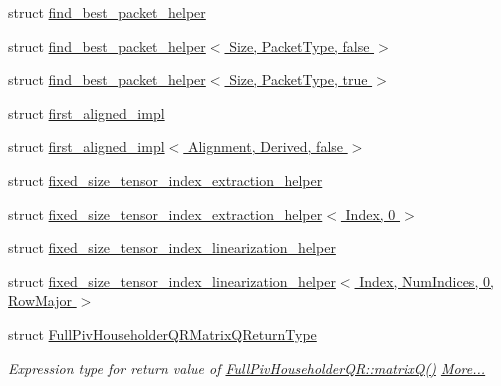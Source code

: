 \begin{DoxyCompactItemize}
\item 
struct \hyperlink{struct_eigen_1_1internal_1_1find__best__packet__helper}{find\+\_\+best\+\_\+packet\+\_\+helper}
\item 
struct \hyperlink{struct_eigen_1_1internal_1_1find__best__packet__helper_3_01_size_00_01_packet_type_00_01false_01_4}{find\+\_\+best\+\_\+packet\+\_\+helper$<$ Size, Packet\+Type, false $>$}
\item 
struct \hyperlink{struct_eigen_1_1internal_1_1find__best__packet__helper_3_01_size_00_01_packet_type_00_01true_01_4}{find\+\_\+best\+\_\+packet\+\_\+helper$<$ Size, Packet\+Type, true $>$}
\item 
struct \hyperlink{struct_eigen_1_1internal_1_1first__aligned__impl}{first\+\_\+aligned\+\_\+impl}
\item 
struct \hyperlink{struct_eigen_1_1internal_1_1first__aligned__impl_3_01_alignment_00_01_derived_00_01false_01_4}{first\+\_\+aligned\+\_\+impl$<$ Alignment, Derived, false $>$}
\item 
struct \hyperlink{struct_eigen_1_1internal_1_1fixed__size__tensor__index__extraction__helper}{fixed\+\_\+size\+\_\+tensor\+\_\+index\+\_\+extraction\+\_\+helper}
\item 
struct \hyperlink{struct_eigen_1_1internal_1_1fixed__size__tensor__index__extraction__helper_3_01_index_00_010_01_4}{fixed\+\_\+size\+\_\+tensor\+\_\+index\+\_\+extraction\+\_\+helper$<$ Index, 0 $>$}
\item 
struct \hyperlink{struct_eigen_1_1internal_1_1fixed__size__tensor__index__linearization__helper}{fixed\+\_\+size\+\_\+tensor\+\_\+index\+\_\+linearization\+\_\+helper}
\item 
struct \hyperlink{struct_eigen_1_1internal_1_1fixed__size__tensor__index__linearization__helper_3_01_index_00_01_n48be286421c8b3a07bb17ebfc895db83}{fixed\+\_\+size\+\_\+tensor\+\_\+index\+\_\+linearization\+\_\+helper$<$ Index, Num\+Indices, 0, Row\+Major $>$}
\item 
struct \hyperlink{group___q_r___module_struct_eigen_1_1internal_1_1_full_piv_householder_q_r_matrix_q_return_type}{Full\+Piv\+Householder\+Q\+R\+Matrix\+Q\+Return\+Type}
\begin{DoxyCompactList}\small\item\em Expression type for return value of \hyperlink{group___q_r___module_ad26dd2d3c002939771d2375e4e051c28}{Full\+Piv\+Householder\+Q\+R\+::matrix\+Q()}  \hyperlink{group___q_r___module_struct_eigen_1_1internal_1_1_full_piv_householder_q_r_matrix_q_return_type}{More...}\end{DoxyCompactList}\item 

\end{DoxyCompactItemize}
